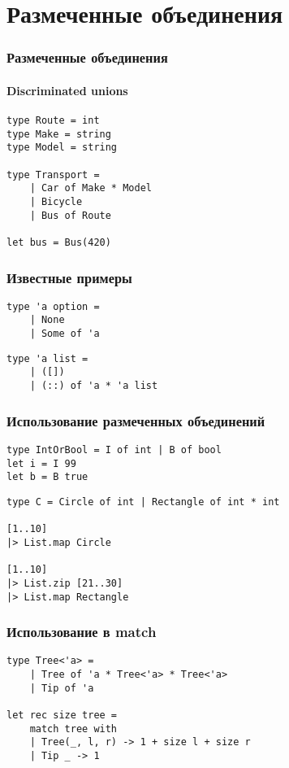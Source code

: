 \documentclass[xetex,mathserif,serif]{beamer}
\begin{document}
	\section{Размеченные объединения}
	
	\begin{frame}[fragile]
		\frametitle{Размеченные объединения}
		\framesubtitle{Discriminated unions}
		\begin{verbatim}
type Route = int
type Make = string
type Model = string

type Transport =
    | Car of Make * Model
    | Bicycle
    | Bus of Route

let bus = Bus(420)
		\end{verbatim}
	\end{frame}

	\begin{frame}[fragile]
		\frametitle{Известные примеры}
		\begin{verbatim}
type 'a option =
    | None
    | Some of 'a
		\end{verbatim}

		\vspace{5mm}
		\begin{verbatim}
type 'a list =
    | ([])
    | (::) of 'a * 'a list
		\end{verbatim}
	\end{frame}

	\begin{frame}[fragile]
		\frametitle{Использование размеченных объединений}
		\begin{verbatim}
type IntOrBool = I of int | B of bool
let i = I 99
let b = B true
		\end{verbatim}
		
		\begin{verbatim}
type C = Circle of int | Rectangle of int * int

[1..10]
|> List.map Circle

[1..10]
|> List.zip [21..30]
|> List.map Rectangle
		\end{verbatim}
	\end{frame}

	\begin{frame}[fragile]
		\frametitle{Использование в match}
		\begin{verbatim}
type Tree<'a> =
    | Tree of 'a * Tree<'a> * Tree<'a>
    | Tip of 'a

let rec size tree =
    match tree with
    | Tree(_, l, r) -> 1 + size l + size r
    | Tip _ -> 1
		\end{verbatim}
	\end{frame}
\end{document}
